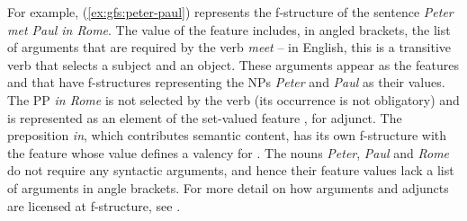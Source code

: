 \documentclass[output=paper]{../langscibook}
\begin{document}
 For example, (\ref{ex:gfs:peter-paul}) represents the f-structure of the sentence \textit{Peter met Paul in Rome}. The value of the feature \PRED includes, in angled brackets, the list of arguments that are required by the verb \emph{meet} -- in English, this is a transitive verb that selects a subject and an object. These arguments appear as the features \SUBJ and \OBJ that have f-structures representing the NPs \textit{Peter} and \textit{Paul} as their values. The PP \textit{in Rome} is not selected by the verb (its occurrence is not obligatory) and is represented as an element of the set-valued feature \ADJ, for adjunct. The preposition \textit{in}, which contributes semantic content, has its own f-structure with the feature \PRED whose value defines a valency for \OBJ. The nouns \textit{Peter}, \textit{Paul} and \textit{Rome} do not require any syntactic arguments, and hence their \PRED feature values lack a list of arguments in angle brackets. For more detail on how arguments and adjuncts are licensed at f-structure, see .
 
 
\end{document}
